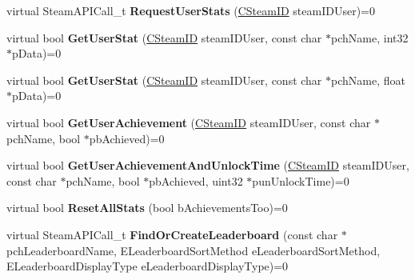 \begin{DoxyCompactItemize}
\item 
\hypertarget{classISteamUserStats_aa0e02e12a7ce9fe7645d3d459a9ca9ed}{}virtual Steam\+A\+P\+I\+Call\+\_\+t {\bfseries Request\+User\+Stats} (\hyperlink{classCSteamID}{C\+Steam\+I\+D} steam\+I\+D\+User)=0\label{classISteamUserStats_aa0e02e12a7ce9fe7645d3d459a9ca9ed}

\item 
\hypertarget{classISteamUserStats_a586b19fc2da8208010944a8fa3a3bd52}{}virtual bool {\bfseries Get\+User\+Stat} (\hyperlink{classCSteamID}{C\+Steam\+I\+D} steam\+I\+D\+User, const char $\ast$pch\+Name, int32 $\ast$p\+Data)=0\label{classISteamUserStats_a586b19fc2da8208010944a8fa3a3bd52}

\item 
\hypertarget{classISteamUserStats_ae81412efaee9f896f58fab3a483bdc2e}{}virtual bool {\bfseries Get\+User\+Stat} (\hyperlink{classCSteamID}{C\+Steam\+I\+D} steam\+I\+D\+User, const char $\ast$pch\+Name, float $\ast$p\+Data)=0\label{classISteamUserStats_ae81412efaee9f896f58fab3a483bdc2e}

\item 
\hypertarget{classISteamUserStats_a2fd15de7d4cfa14d2146f63fda3b4f71}{}virtual bool {\bfseries Get\+User\+Achievement} (\hyperlink{classCSteamID}{C\+Steam\+I\+D} steam\+I\+D\+User, const char $\ast$pch\+Name, bool $\ast$pb\+Achieved)=0\label{classISteamUserStats_a2fd15de7d4cfa14d2146f63fda3b4f71}

\item 
\hypertarget{classISteamUserStats_a7c178b581de8759ff1b82f039242c7b0}{}virtual bool {\bfseries Get\+User\+Achievement\+And\+Unlock\+Time} (\hyperlink{classCSteamID}{C\+Steam\+I\+D} steam\+I\+D\+User, const char $\ast$pch\+Name, bool $\ast$pb\+Achieved, uint32 $\ast$pun\+Unlock\+Time)=0\label{classISteamUserStats_a7c178b581de8759ff1b82f039242c7b0}

\item 
\hypertarget{classISteamUserStats_a2268bc9272b59943cc78fbd50fa0eab0}{}virtual bool {\bfseries Reset\+All\+Stats} (bool b\+Achievements\+Too)=0\label{classISteamUserStats_a2268bc9272b59943cc78fbd50fa0eab0}

\item 
\hypertarget{classISteamUserStats_a4e46e5be8fc1048238f56ffce67a60b2}{}virtual Steam\+A\+P\+I\+Call\+\_\+t {\bfseries Find\+Or\+Create\+Leaderboard} (const char $\ast$pch\+Leaderboard\+Name, E\+Leaderboard\+Sort\+Method e\+Leaderboard\+Sort\+Method, E\+Leaderboard\+Display\+Type e\+Leaderboard\+Display\+Type)=0\label{classISteamUserStats_a4e46e5be8fc1048238f56ffce67a60b2}


\end{DoxyCompactItemize}

